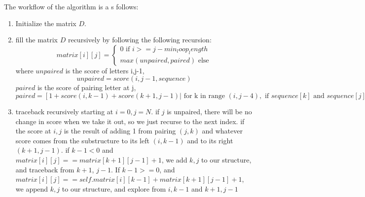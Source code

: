 The workflow of the algorithm is a s follows:
\begin{enumerate}
  \item Initialize the matrix $D$.
  \item fill the matrix $D$ recursively by following the following recursion:
  $$matrix[i][j] = \begin{cases}0 \text{ if } i >= j - min_loop_length\\
  max(unpaired, paired) \text{ else}
  \end{cases} $$
  where $unpaired$ is the score of letters i,j-1, $$unpaired = score(i, j - 1, sequence)$$
  $paired$ is the score of pairing letter at j,
  $paired = [ 1 + score(i, k - 1) + score(k + 1, j - 1) | \text{ for  k in range } (i, j - 4), \text{ if } sequence[k] \text{ and } sequence[j]  \text{ is a basepair}]$
  \item traceback recursively starting at $i=0,j=N$.
  if $j$ is unpaired, there will be no change in score when we take it out, so we just recurse to the next index.
  if the score at $i,j$ is the result of adding 1 from pairing $(j,k)$ and whatever score
   comes from the substructure to its left $(i, k-1)$ and to its right $(k+1, j-1)$.
   if $k-1 < 0$ and  $matrix[i][j] == matrix[k + 1][j - 1] + 1$, we add $k,j$ to our structure,
   and traceback from $k+1$, $j-1$.
   If $k -1 >= 0$, and $matrix[i][j] == self.matrix[i][k - 1] + matrix[k + 1][j - 1] + 1$, we append $k,j$ to our structure, and explore from $i,k-1$  and $k+1,j-1$

\end{enumerate}
